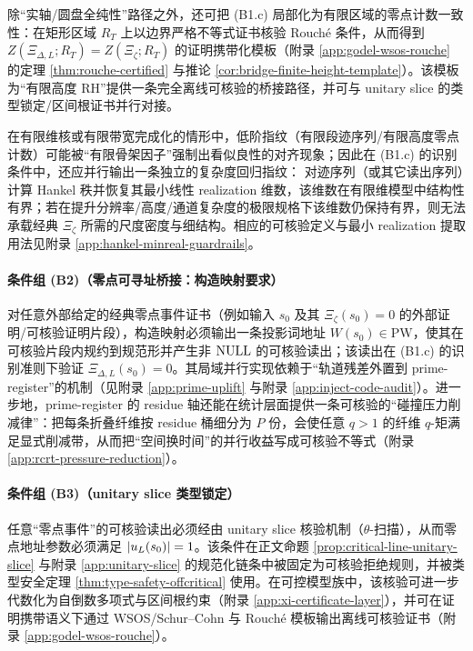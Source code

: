 \begin{remark}\label{rem:rouche-protocol-path}
除“实轴/圆盘全纯性”路径之外，还可把 (B1.c) 局部化为有限区域的零点计数一致性：在矩形区域 $R_T$ 上以边界严格不等式证书核验 Rouch{\'e} 条件，从而得到 $Z(\Xi_{\Delta,L};R_T)=Z(\Xi_\zeta;R_T)$ 的证明携带化模板（附录 \ref{app:godel-wsos-rouche} 的定理 \ref{thm:rouche-certified} 与推论 \ref{cor:bridge-finite-height-template}）。该模板为“有限高度 RH”提供一条完全离线可核验的桥接路径，并可与 unitary slice 的类型锁定/区间根证书并行对接。
\end{remark}

\begin{remark}\label{rem:hankel-minreal-guardrail}
在有限维核或有限带宽完成化的情形中，低阶指纹（有限段迹序列/有限高度零点计数）可能被“有限骨架因子”强制出看似良性的对齐现象；因此在 (B1.c) 的识别条件中，还应并行输出一条独立的复杂度回归指纹：
对迹序列（或其它读出序列）计算 Hankel 秩并恢复其最小线性 realization 维数，该维数在有限维模型中结构性有界；若在提升分辨率/高度/通道复杂度的极限规格下该维数仍保持有界，则无法承载经典 $\Xi_\zeta$ 所需的尺度密度与细结构。相应的可核验定义与最小 realization 提取用法见附录 \ref{app:hankel-minreal-guardrails}。
\end{remark}

\paragraph{条件组 (B2)（零点可寻址桥接：构造映射要求）}
对任意外部给定的经典零点事件证书（例如输入 $s_0$ 及其 $\Xi_\zeta(s_0)=0$ 的外部证明/可核验证明片段），构造映射必须输出一条投影词地址 $W(s_0)\in\mathrm{PW}$，使其在可核验片段内规约到规范形并产生非 $\mathrm{NULL}$ 的可核验读出；该读出在 (B1.c) 的识别准则下验证 $\Xi_{\Delta,L}(s_0)=0$。其局域并行实现依赖于“轨道残差外置到 prime-register”的机制（见附录 \ref{app:prime-uplift} 与附录 \ref{app:inject-code-audit}）。进一步地，prime-register 的 residue 轴还能在统计层面提供一条可核验的“碰撞压力削减律”：把每条折叠纤维按 residue 桶细分为 \(P\) 份，会使任意 \(q>1\) 的纤维 \(q\)-矩满足显式削减带，从而把“空间换时间”的并行收益写成可核验不等式（附录 \ref{app:rcrt-pressure-reduction}）。

\paragraph{条件组 (B3)（unitary slice 类型锁定）}
任意“零点事件”的可核验读出必须经由 unitary slice 核验机制（$\theta$-扫描），从而零点地址参数必须满足 $\left\lvert u_L(s_0)\right\rvert=1$。该条件在正文命题 \ref{prop:critical-line-unitary-slice} 与附录 \ref{app:unitary-slice} 的规范化链条中被固定为可核验拒绝规则，并被类型安全定理 \ref{thm:type-safety-offcritical} 使用。在可控模型族中，该核验可进一步代数化为自倒数多项式与区间根约束（附录 \ref{app:xi-certificate-layer}），并可在证明携带语义下通过 WSOS/Schur--Cohn 与 Rouché 模板输出离线可核验证书（附录 \ref{app:godel-wsos-rouche}）。

